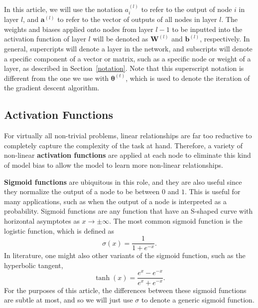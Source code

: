 \documentclass[12pt]{report}
\theoremstyle{definition}
\theoremstyle{remark}
\begin{document}
In this article, we will use the notation $a^{(l)}_i$ to refer to the output of node $i$ in layer $l$, and $\mathbf{a}^{(l)}$ to refer to the vector of outputs of all nodes in layer $l$. The weights and biases applied onto nodes from layer $l-1$ to be inputted into the activation function of layer $l$ will be denoted as $\mathbf{W}^{(l)}$ and $\mathbf{b}^{(l)}$, respectively. In general, supercripts will denote a layer in the network, and subscripts will denote a specific component of a vector or matrix, such as a specific node or weight of a layer, as described in Section~\ref{notation}. Note that this superscript notation is different from the one we use with $\boldsymbol{\theta}^{(t)}$, which is used to denote the iteration of the gradient descent algorithm.

\subsection{Activation Functions}

For virtually all non-trivial problems, linear relationships are far too reductive to completely capture the complexity of the task at hand. Therefore, a variety of non-linear \textbf{activation functions} are applied at each node to eliminate this kind of model bias to allow the model to learn more non-linear relationships.

\textbf{Sigmoid functions} are ubiquitous in this role, and they are also useful since they normalize the output of a node to be between $0$ and $1$. This is useful for many applications, such as when the output of a node is interpreted as a probability. Sigmoid functions are any function that have an S-shaped curve with horizontal asymptotes as $x \rightarrow \pm \infty$. The most common sigmoid function is the logistic function, which is defined as
\begin{equation}
    \sigma(x) = \frac{1}{1+e^{-x}}.
\end{equation}
In literature, one might also other variants of the sigmoid function, such as the hyperbolic tangent,
\begin{equation}
    \tanh(x) = \frac{e^x - e^{-x}}{e^x + e^{-x}}.
\end{equation}
For the purposes of this article, the differences between these sigmoid functions are subtle at most, and so we will just use $\sigma$ to denote a generic sigmoid function.
\end{document}
